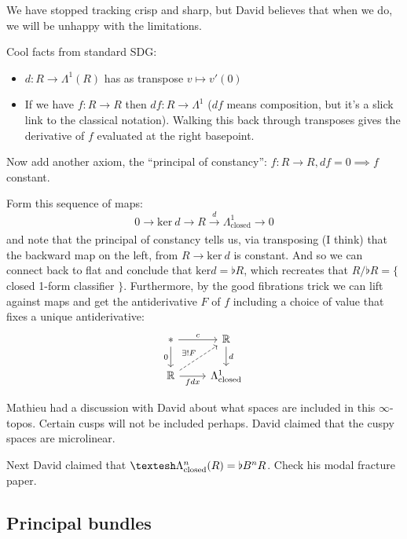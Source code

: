 \documentclass[17pt]{extarticle}
\begin{document}
We have stopped tracking crisp and sharp, but David believes that when we do, we will be unhappy with the limitations.

Cool facts from standard SDG:
\begin{itemize}
\item $d:R\to \Lambda^1(R)$ has as transpose $v\mapsto v'(0)$
\item If we have $f:R\to R$ then $df:R\to\Lambda^1$ ($df$ means composition, but it's a slick link to the classical notation). Walking this back through transposes gives the derivative of $f$ evaluated at the right basepoint.
\end{itemize}

Now add another axiom, the ``principal of constancy'': $f:R\to R, df=0 \implies f$ constant.

Form this sequence of maps: $$0\to \mathrm{ker}\ d\to R\xrightarrow[]{d} \Lambda^1_{\mathrm{closed}} \to 0$$
and note that the principal of constancy tells us, via transposing (I think) that the backward map on the left, from $R\to \mathrm{ker}\ d$ is constant. And so we can connect back to flat and conclude that $\mathrm{ker}d = \flat R$, which recreates that $R / \flat R = \{\!$ closed 1-form classifier $\!\}$. Furthermore, by the good fibrations trick we can lift against maps and get the antiderivative $F$ of $f$ including a choice of value that fixes a unique antiderivative:
\[\begin{tikzcd}
	{*} & {\mathbb{R}} \\
	{\mathbb{R}} & {\Lambda^1_\mathrm{closed}}
	\arrow["c", from=1-1, to=1-2]
	\arrow["d", from=1-2, to=2-2]
	\arrow["0"', from=1-1, to=2-1]
	\arrow["fdx"', from=2-1, to=2-2]
	\arrow["{\exists !F}", dashed, from=2-1, to=1-2]
\end{tikzcd}\]

Mathieu had a discussion with David about what spaces are included in this $\infty$-topos. Certain cusps will not be included perhaps. David claimed that the cuspy spaces are microlinear.

Next David claimed that $\shape\Lambda^n_\mathrm{closed}(R) = \flat B^n R$. Check his modal fracture paper.

\subsection{Principal bundles}
\end{document}
